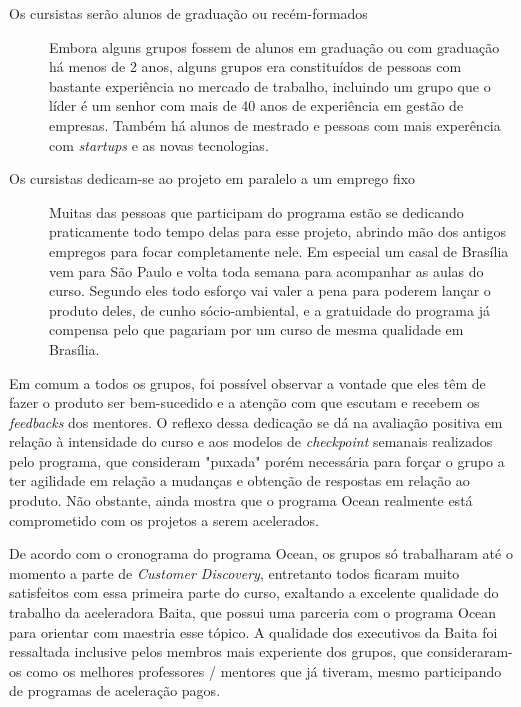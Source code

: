 \begin{description}
\item[Os cursistas serão alunos de graduação ou recém-formados] 

Embora alguns grupos fossem de alunos em graduação ou com graduação há menos de 2 anos, alguns grupos era constituídos de pessoas com bastante experiência no mercado de trabalho, incluindo um grupo que o líder é um senhor com mais de 40 anos de experiência em gestão de empresas. Também há alunos de mestrado e pessoas com mais experência com \textit{startups} e as novas tecnologias.

\item[Os cursistas dedicam-se ao projeto em paralelo a um emprego fixo] 

Muitas das pessoas que participam do programa estão se dedicando praticamente todo tempo delas para esse projeto, abrindo mão dos antigos empregos para focar completamente nele. Em especial um casal de Brasília vem para São Paulo e volta toda semana para acompanhar as aulas do curso. Segundo eles todo esforço vai valer a pena para poderem lançar o produto deles, de cunho sócio-ambiental, e a gratuidade do programa já compensa pelo que pagariam por um curso de mesma qualidade em Brasília.

\end{description}

Em comum a todos os grupos, foi possível observar a vontade que eles têm de fazer o produto ser bem-sucedido e a atenção com que escutam e recebem os \textit{feedbacks} dos mentores. O reflexo dessa dedicação se dá na avaliação positiva em relação à intensidade do curso e aos modelos de \textit{checkpoint} semanais realizados pelo programa, que consideram "puxada" porém necessária para forçar o grupo a ter agilidade em relação a mudanças e obtenção de respostas em relação ao produto. Não obstante, ainda mostra que o programa Ocean realmente está comprometido com os projetos a serem acelerados.

De acordo com o cronograma do programa Ocean, os grupos só trabalharam até o momento a parte de \textit{Customer Discovery}, entretanto todos ficaram muito satisfeitos com essa primeira parte do curso, exaltando a excelente qualidade do trabalho da aceleradora Baita, que possui uma parceria com o programa Ocean para orientar com maestria esse tópico. A qualidade dos executivos da Baita foi ressaltada inclusive pelos membros mais experiente dos grupos, que consideraram-os como os melhores professores / mentores que já tiveram, mesmo participando de programas de aceleração pagos.

